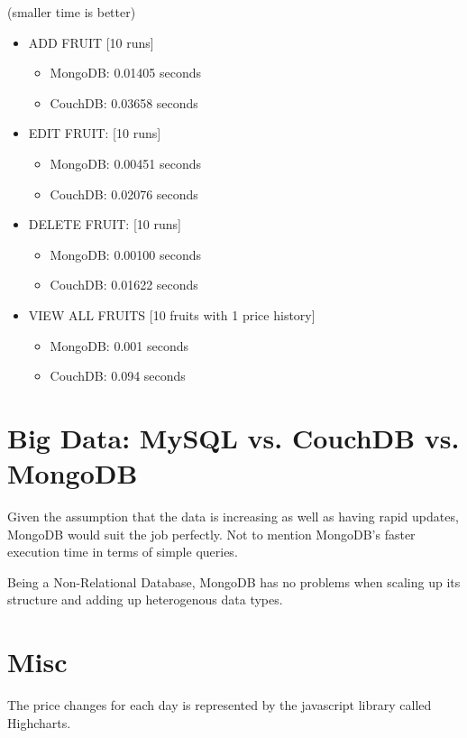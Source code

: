 \documentclass[journal]{./IEEE/IEEEtran}
\begin{document}
(smaller time is better)
\begin{itemize}
\item{ADD FRUIT [10 runs]}
	\begin{itemize}
	\item{MongoDB: 0.01405 seconds}
	\item{CouchDB: 0.03658 seconds}
	\end{itemize}
\item{EDIT FRUIT: [10 runs]}
	\begin{itemize}
	\item{MongoDB: 0.00451 seconds}
	\item{CouchDB: 0.02076 seconds}
	\end{itemize}

\item{DELETE FRUIT: [10 runs]}
	\begin{itemize}
	\item{MongoDB: 0.00100 seconds}
	\item{CouchDB: 0.01622 seconds}
	\end{itemize}

\item{VIEW ALL FRUITS [10 fruits with 1 price history]}
	\begin{itemize}
	\item{MongoDB: 0.001 seconds}
	\item{CouchDB: 0.094 seconds}
	\end{itemize}
\end{itemize}

\section{Big Data: MySQL vs. CouchDB vs. MongoDB}

Given the assumption that the data is increasing as well as having rapid updates, MongoDB would suit the job perfectly. Not to mention MongoDB's faster execution time in terms of simple queries.

Being a Non-Relational Database, MongoDB has no problems when scaling up its structure and adding up heterogenous data types.

\section{Misc}

The price changes for each day is represented by the javascript library called Highcharts.
\end{document}

